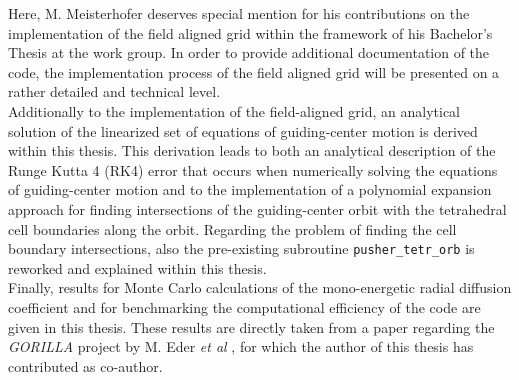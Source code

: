 \documentclass[main.tex]{subfiles}
\begin{document}
Here, M. Meisterhofer deserves special mention for his contributions on the implementation of the field aligned grid within the framework of his Bachelor's Thesis at the work group. In order to provide additional documentation of the code, the implementation process of the field aligned grid will be presented on a rather detailed and technical level.\\
Additionally to the implementation of the field-aligned grid, an analytical solution of the linearized set of equations of guiding-center motion is derived within this thesis. This derivation leads to both an analytical description of the Runge Kutta 4 (RK4) error that occurs when numerically solving the equations of guiding-center motion and to the implementation of a polynomial expansion approach for finding intersections of the guiding-center orbit with the tetrahedral cell boundaries along the orbit. Regarding the problem of finding the cell boundary intersections, also the pre-existing subroutine  \texttt{pusher\_tetr\_orb} is reworked and explained within this thesis.\\
Finally, results for Monte Carlo calculations of the mono-energetic radial diffusion coefficient and for benchmarking the computational efficiency of the code are given in this thesis. These results are directly taken from a paper regarding the \textit{GORILLA} project by M. Eder \textit{et al} \cite{paper_gorilla}, for which the author of this thesis has contributed as co-author.
\end{document}
